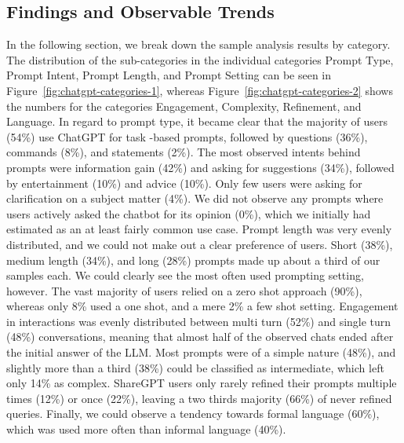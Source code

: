 \subsection{Findings and Observable Trends}
\label{subsec:findings-and-observable-trends}
In the following section, we break down the sample analysis results by category.
The distribution of the sub-categories in the individual categories Prompt Type, Prompt
Intent, Prompt Length, and Prompt Setting can be seen in Figure~\ref{fig:chatgpt-categories-1},
whereas Figure~\ref{fig:chatgpt-categories-2} shows the numbers for the categories Engagement,
Complexity, Refinement, and Language.
In regard to prompt type, it became clear that the majority of users (54\%) use ChatGPT for task -based prompts, followed by questions (36\%), commands (8\%), and statements (2\%).
The most observed intents behind prompts were information gain (42\%) and asking for suggestions (34\%), followed by entertainment (10\%) and advice (10\%).
Only few users were asking for clarification on a subject matter (4\%).
We did not observe any prompts where users actively asked the chatbot for its
opinion (0\%), which we initially had estimated as an at least fairly common use case.
Prompt length was very evenly distributed, and we could not make out a clear preference of users.
Short (38\%), medium length (34\%), and long (28\%) prompts made up about a third of our samples
each.
We could clearly see the most often used prompting setting, however.
The vast majority of users relied on a zero shot approach (90\%), whereas only 8\% used a one shot,
and a mere 2\% a few shot setting.
Engagement in interactions was evenly distributed between multi turn (52\%) and single turn (48\%)
conversations, meaning that almost half of the observed chats ended after the initial answer of
the LLM\@.
Most prompts were of a simple nature (48\%), and slightly more than a third (38\%) could be
classified as intermediate, which left only 14\% as complex.
ShareGPT users only rarely refined their prompts multiple times (12\%) or once (22\%),
leaving a two thirds majority (66\%) of never refined queries.
Finally, we could observe a tendency towards formal language (60\%), which was used more often
than informal language (40\%).

